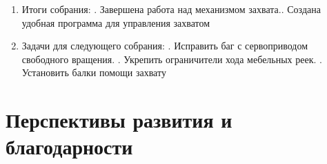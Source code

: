 \documentclass[12pt]{article}
\begin{document}
\begin{enumerate}
	      	\item Итоги собрания:
	      	.	Завершена работа над механизмом захвата..	Создана удобная программа для управления захватом
	      	
	      	\item Задачи для следующего собрания:
	      	.	Исправить баг с сервоприводом свободного вращения.	.	Укрепить ограничители хода мебельных реек.	.	Установить балки помощи захвату
	      	
	      \end{enumerate}
	      \newpage
	   \section{Перспективы развития и благодарности}

	   
\end{document}
